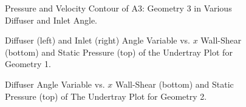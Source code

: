 \begin{figure}
    \noindent{}
    \caption{Pressure and Velocity Contour of A3: Geometry 3 in Various Diffuser and Inlet Angle.}
    \label{fig:2D_OF_A3_Contour1}
\end{figure}



\begin{figure}
    \noindent{}
    \caption{Diffuser (left) and Inlet (right) Angle Variable vs. $x$ Wall-Shear (bottom) and Static Pressure (top) of the Undertray Plot for Geometry 1.}
    \label{fig:2D_OF_A1_PLOT}
\end{figure}

\begin{figure}
    \noindent{}
    \caption{Diffuser Angle Variable vs. $x$ Wall-Shear (bottom) and Static Pressure (top) of The Undertray Plot for Geometry 2.}
    \label{fig:2D_OF_A2_PLOT}
\end{figure}

